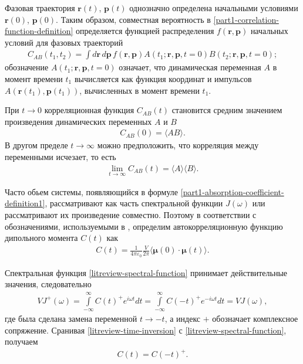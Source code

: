 \documentclass[12pt]{article}
\newcommand{\mf}{\mathbf}
\newcommand{\lb}{\left(}
\newcommand{\rb}{\right)}
\newcommand{\intty}{\int\limits_{-\infty}^\infty}
\newcommand{\mean}[1]{\langle #1 \rangle}
\newcommand{\bs}{\boldsymbol}
\begin{document}
Фазовая траектория $\mf{r}(t)$, $\mf{p}(t)$ однозначно определена начальными условиями $\mf{r}(0)$, $\mf{p}(0)$. Таким образом, совместная вероятность в \eqref{part1-correlation-function-definition} определяется функцией распределения $f(\mf{r}, \mf{p})$ начальных условий для фазовых траекторий
\begin{gather}
    C_{AB}(t_1, t_2) = \int d\mf{r} \, d\mf{p} \, f \lb \mf{r}, \mf{p} \rb A\lb t_1; \mf{r}, \mf{p}, t = 0 \rb B \lb t_2; \mf{r}, \mf{p}, t = 0 \rb;
\end{gather}
%
обозначение $A(t_1; \mf{r}, \mf{p}, t = 0)$ означает, что динамическая переменная $A$ в момент времени $t_1$ вычисляется как функция координат и импульсов $A(\mf{r}(t_1), \mf{p}(t_1))$, вычисленных в момент времени $t_1$. \par
    При $t \rightarrow 0$ корреляционная функция $C_{AB}(t)$ становится средним значением произведения динамических переменных $A$ и $B$
\begin{gather}
    C_{AB}(0) = \mean{AB}.
\end{gather}
%
В другом пределе $t \rightarrow \infty$ можно предположить, что корреляция между переменными исчезает, то есть
\begin{gather}
    \lim_{t \rightarrow \infty} C_{AB}(t) = \mean{A} \mean{B}.
\end{gather}

Часто обьем системы, появляющийся в формуле \eqref{part1-absorption-coefficient-definition1}, рассматривают как часть спектральной функции $J(\omega)$ или рассматривают их произведение совместно. Поэтому в соответствии с обозначениями, используемыми в \cite{frommhold}, определим автокорреляционную функцию дипольного момента $C(t)$ как
\begin{gather}
    C(t) = \frac{1}{4 \pi \varepsilon_0} \frac{V}{2\pi} \mean{\bs{\mu}(0) \cdot \bs{\mu}(t)}. \label{litreview-autocorrelation-function-definition}
\end{gather}

Спектральная функция \eqref{litreview-spectral-function} принимает действительные значения, следовательно
\begin{gather}
    V J^+(\omega) = \intty C(t)^+ e^{i \omega t} dt = \intty C(-t)^+ e^{-i\omega t} dt = VJ(\omega), \label{litreview-time-inversion}
\end{gather}
%
где была сделана замена переменной $t \rightarrow -t$, а индекс $+$ обозначает комплексное сопряжение. Сранивая \eqref{litreview-time-inversion} с \eqref{litreview-spectral-function}, получаем
\begin{gather}
    C(t) = C(-t)^+.
\end{gather}
\end{document}
